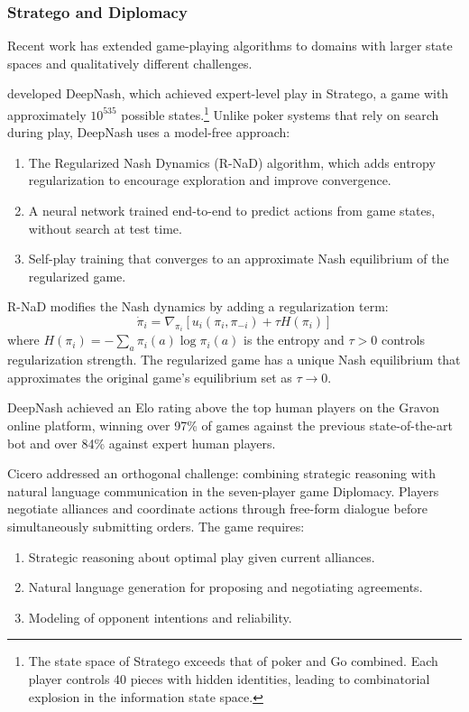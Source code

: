 \subsubsection{Stratego and Diplomacy}

Recent work has extended game-playing algorithms to domains with larger state spaces and qualitatively different challenges.

\citet{deepmind2022} developed DeepNash, which achieved expert-level play in Stratego, a game with approximately $10^{535}$ possible states.\footnote{The state space of Stratego exceeds that of poker and Go combined. Each player controls 40 pieces with hidden identities, leading to combinatorial explosion in the information state space.} Unlike poker systems that rely on search during play, DeepNash uses a model-free approach:
\begin{enumerate}
    \item The Regularized Nash Dynamics (R-NaD) algorithm, which adds entropy regularization to encourage exploration and improve convergence.
    \item A neural network trained end-to-end to predict actions from game states, without search at test time.
    \item Self-play training that converges to an approximate Nash equilibrium of the regularized game.
\end{enumerate}

R-NaD modifies the Nash dynamics by adding a regularization term:
\begin{equation}
\dot{\pi}_i = \nabla_{\pi_i} \left[ u_i(\pi_i, \pi_{-i}) + \tau H(\pi_i) \right]
\end{equation}
where $H(\pi_i) = -\sum_a \pi_i(a) \log \pi_i(a)$ is the entropy and $\tau > 0$ controls regularization strength. The regularized game has a unique Nash equilibrium that approximates the original game's equilibrium set as $\tau \to 0$.

DeepNash achieved an Elo rating above the top human players on the Gravon online platform, winning over 97\% of games against the previous state-of-the-art bot and over 84\% against expert human players.

Cicero \citep{bakhtin2022human} addressed an orthogonal challenge: combining strategic reasoning with natural language communication in the seven-player game Diplomacy. Players negotiate alliances and coordinate actions through free-form dialogue before simultaneously submitting orders. The game requires:
\begin{enumerate}
    \item Strategic reasoning about optimal play given current alliances.
    \item Natural language generation for proposing and negotiating agreements.
    \item Modeling of opponent intentions and reliability.
\end{enumerate}

